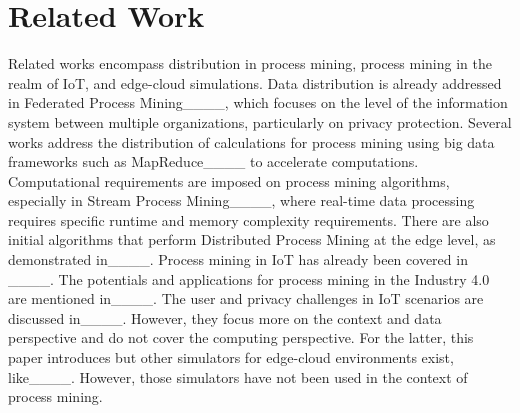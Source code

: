 \section{Related Work}
Related works encompass distribution in process mining, process mining in the realm of IoT, and edge-cloud simulations. Data distribution is already addressed in Federated Process Mining____, which focuses on the level of the information system between multiple organizations, particularly on privacy protection. Several works address the distribution of calculations for process mining using big data frameworks such as MapReduce____ to accelerate computations. Computational requirements are imposed on process mining algorithms, especially in Stream Process Mining____, where real-time data processing requires specific runtime and memory complexity requirements. There are also initial algorithms that perform Distributed Process Mining at the edge level, as demonstrated in____. Process mining in IoT has already been covered in ____. The potentials and applications for process mining in the Industry 4.0 are mentioned in____. The user and privacy challenges in IoT scenarios are discussed in____. However, they focus more on the context and data perspective and do not cover the computing perspective. For the latter, this paper introduces \name but other simulators for edge-cloud environments exist, like____. However, those simulators have not been used in the context of process mining.
